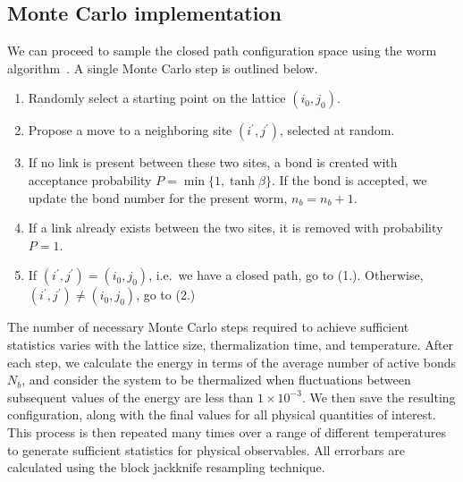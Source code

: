 \documentclass[../main.tex]{subfiles}
\begin{document}
\subsection{Monte Carlo implementation}%
\label{ssec:monte_carlo_implementation}
We can proceed to sample the closed path configuration space using the worm
algorithm~\cite{prok87}.
%
A single Monte Carlo step is outlined below.
%
\begin{enumerate}
    \item Randomly select a starting point on the lattice $(i_0, j_0)$.
    \item Propose a move to a neighboring site $(i^{\prime}, j^{\prime})$,
        selected at random.
    \item If no link is present between these two sites, a bond is created with
        acceptance probability $P = \min\{1, \tanh{\beta}\}$. If the bond is
        accepted, we update the bond number for the present worm, $n_b = n_b +
        1$.
    \item If a link already exists between the two sites, it is removed with
        probability $P = 1$.
    \item If $(i^{\prime}, j^{\prime}) = (i_0, j_0)$, i.e.\ we have a closed
        path, go to (1.). Otherwise, $(i^{\prime}, j^{\prime}) \neq (i_0,
        j_0)$, go to (2.)
\end{enumerate}
%
The number of necessary Monte Carlo steps required to achieve sufficient
statistics varies with the lattice size, thermalization time, and temperature.
%
After each step, we calculate the energy in terms of the average number of
active bonds $N_b$, and consider the system to be thermalized when fluctuations
between subsequent values of the energy are less than $1\times10^{-3}$.
%
We then save the resulting configuration, along with the final values for all
physical quantities of interest.
%
This process is then repeated many times over a range of different temperatures
to generate sufficient statistics for physical observables.
%
All errorbars are calculated using the block jackknife resampling technique. 
%
\end{document}
